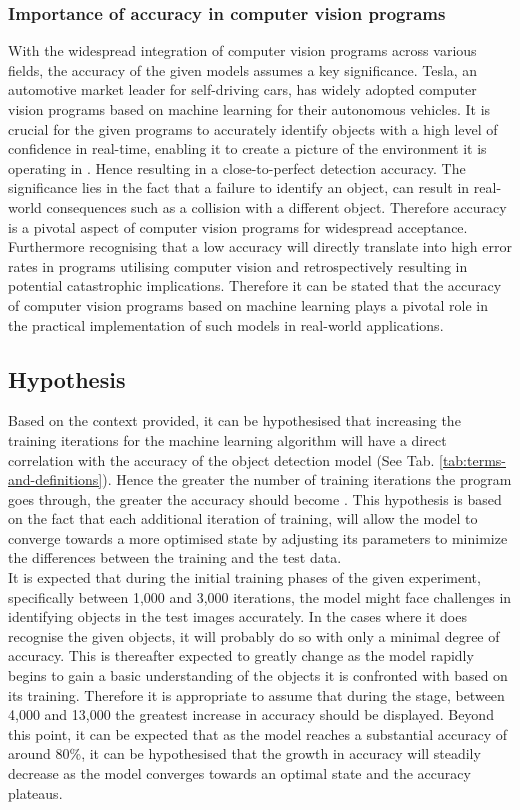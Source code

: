 \subsubsection{Importance of accuracy in computer vision programs}
With the widespread integration of computer vision programs across various fields, the accuracy of the given models assumes a key significance. Tesla, an automotive market leader for self-driving cars, has widely adopted computer vision programs based on machine learning for their autonomous vehicles. It is crucial for the given programs to accurately identify objects with a high level of confidence in real-time, enabling it to create a picture of the environment it is operating in \parencite{Baeldung2022}. Hence resulting in a close-to-perfect detection accuracy. The significance lies in the fact that a failure to identify an object, can result in real-world consequences such as a collision with a different object. Therefore accuracy is a pivotal aspect of computer vision programs for widespread acceptance. Furthermore recognising that a low accuracy will directly translate into high error rates in programs utilising computer vision and retrospectively resulting in potential catastrophic implications. Therefore it can be stated that the accuracy of computer vision programs based on machine learning plays a pivotal role in the practical implementation of such models in real-world applications. 


\subsection{Hypothesis}
Based on the context provided, it can be hypothesised that increasing the training iterations for the machine learning algorithm will have a direct correlation with the accuracy of the object detection model (See Tab. \ref{tab:terms-and-definitions}). Hence the greater the number of training iterations the program goes through, the greater the accuracy should become \parencite[p.~362--371]{Nagaki2021}. This hypothesis is based on the fact that each additional iteration of training, will allow the model to converge towards a more optimised state by adjusting its parameters to minimize the differences between the training and the test data.\\


It is expected that during the initial training phases of the given experiment, specifically between 1,000 and 3,000 iterations, the model might face challenges in identifying objects in the test images accurately. In the cases where it does recognise the given objects, it will probably do so with only a minimal degree of accuracy. This is thereafter expected to greatly change as the model rapidly begins to gain a basic understanding of the objects it is confronted with based on its training. Therefore it is appropriate to assume that during the stage, between  4,000 and 13,000 the greatest increase in accuracy should be displayed.  Beyond this point, it can be expected that as the model reaches a substantial accuracy of around 80\%, it can be hypothesised that the growth in accuracy will steadily decrease as the model converges towards an optimal state and the accuracy plateaus.\\


